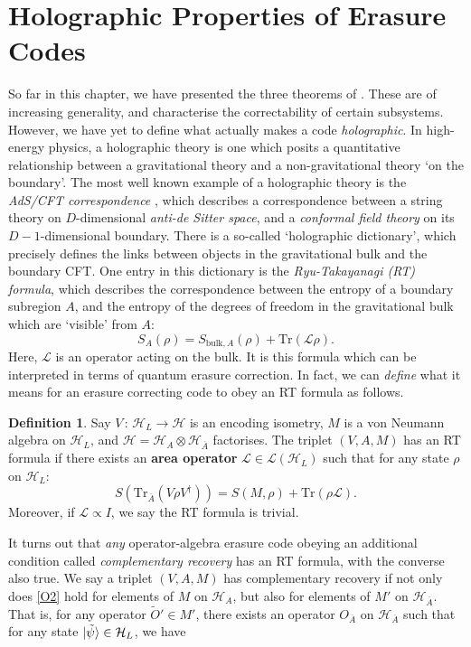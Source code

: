 \documentclass[12pt,a4paper]{report}
\numberwithin{equation}{section}
\newcommand{\ol}[1]{\overline{#1}}
\newcommand{\tr}{\text{Tr}}
\theoremstyle{definition}
\newtheorem{definition}{Definition}[section]
\theoremstyle{theorem}
\theoremstyle{theorem}
\theoremstyle{example}
\theoremstyle{definition}
\begin{document}
\section{Holographic Properties of Erasure Codes}
So far in this chapter, we have presented the three theorems of \cite{Harlow}. These are of increasing generality, and characterise the correctability of certain subsystems. However, we have yet to define what actually makes a code \textit{holographic}. In high-energy physics, a holographic theory is one which posits a quantitative relationship between a gravitational theory and a non-gravitational theory `on the boundary'. The most well known example of a holographic theory is the \textit{AdS/CFT correspondence} \cite{Maldacena}, which describes a correspondence between a string theory on $D$-dimensional \textit{anti-de Sitter space}, and a \textit{conformal field theory} on its $D-1$-dimensional boundary. There is a so-called `holographic dictionary', which precisely defines the links between objects in the gravitational bulk and the boundary CFT. One entry in this dictionary is the \textit{Ryu-Takayanagi (RT) formula}, which describes the correspondence between the entropy of a boundary subregion $A$, and the entropy of the degrees of freedom in the gravitational bulk which are `visible' from $A$:
\begin{equation}
	S_{A}(\rho)=S_{\text{bulk},A}(\rho)+\tr(\mathcal{L}\rho).
\end{equation}
Here, $\mathcal{L}$ is an operator acting on the bulk. It is this formula which can be interpreted in terms of quantum erasure correction. In fact, we can \textit{define} what it means for an erasure correcting code to obey an RT formula as follows.
\begin{definition}
	Say $V\,:\,\mathcal{H}_{L}\to\mathcal{H}$ is an encoding isometry, $M$ is a von Neumann algebra on $\mathcal{H}_{L}$, and $\mathcal{H}=\mathcal{H}_{A}\otimes\mathcal{H}_{\ol{A}}$ factorises. The triplet $(V,A,M)$ has an RT formula if there exists an \textbf{area operator} $\mathcal{L}\in\mathcal{L}(\mathcal{H}_{L})$ such that for any state $\rho$ on $\mathcal{H}_{L}$:
	\begin{equation}\label{RT3}
		S(\tr_{\ol{A}}(V\rho V^{\dagger}))=S(M,\rho)+\tr(\rho\mathcal{L}).
	\end{equation}
	Moreover, if $\mathcal{L}\propto I$, we say the RT formula is trivial.
\end{definition}
It turns out that \textit{any} operator-algebra erasure code obeying an additional condition called \textit{complementary recovery} has an RT formula, with the converse also true. We say a triplet $(V,A,M)$ has complementary recovery if not only does \ref{O2} hold for elements of $M$ on $\mathcal{H}_{A}$, but also for elements of $M'$ on $\mathcal{H}_{\ol{A}}$. That is, for any operator $\tilde{O}'\in M'$, there exists an operator $O_{\ol{A}}$ on $\mathcal{H}_{\ol{A}}$ such that for any state $\ket{\tilde{\psi}}\in\mathcal{H}_{L}$, we have
\end{document}
